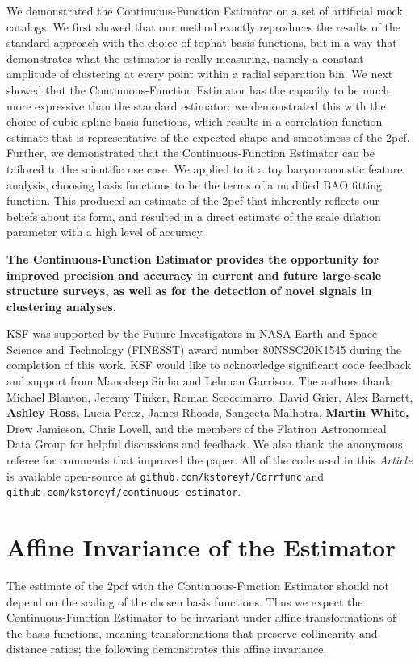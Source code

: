 \documentclass[modern]{aastex62}
\newcommand{\cf}{2pcf\xspace}
\newcommand{\Est}{The Continuous-Function Estimator\xspace}
\newcommand{\est}{the Continuous-Function Estimator\xspace}
\newcommand{\documentname}{\textsl{Article}\xspace}
\newcommand{\new}[1]{\textbf{#1}}
\begin{document}
We demonstrated \est on a set of artificial mock catalogs.
We first showed that our method exactly reproduces the results of the standard approach with the choice of tophat basis functions, but in a way that demonstrates what the estimator is really measuring, namely a constant amplitude of clustering at every point within a radial separation bin.
We next showed that \est has the capacity to be much more expressive than the standard estimator: we demonstrated this with the choice of cubic-spline basis functions, which results in a correlation function estimate that is representative of the expected shape and smoothness of the \cf.
Further, we demonstrated that \est can be tailored to the scientific use case.
We applied to it a toy baryon acoustic feature analysis, choosing basis functions to be the terms of a modified BAO fitting function.
This produced an estimate of the \cf that inherently reflects our beliefs about its form, and resulted in a direct estimate of the scale dilation parameter with a high level of accuracy.

\new{\Est provides the opportunity for improved precision and accuracy in current and future large-scale structure surveys, as well as for the detection of novel signals in clustering analyses.}


\acknowledgements
KSF was supported by the Future Investigators in NASA Earth and Space Science and Technology (FINESST) award number 80NSSC20K1545 during the completion of this work.
KSF would like to acknowledge significant code feedback and support from Manodeep Sinha and Lehman Garrison.
The authors thank Michael Blanton, Jeremy Tinker, Roman Scoccimarro, David Grier, Alex Barnett, \new{Ashley Ross,} Lucia Perez, James Rhoads, Sangeeta Malhotra, \new{Martin White,} Drew Jamieson, Chris Lovell, and the members of the Flatiron Astronomical Data Group for helpful discussions and feedback. 
We also thank the anonymous referee for comments that improved the paper.
All of the code used in this \documentname is available open-source at \texttt{github.com/kstoreyf/Corrfunc} and \texttt{github.com/kstoreyf/continuous-estimator}. 


\appendix

\section{Affine Invariance of the Estimator}\label{sec:affine}

The estimate of the \cf with \est should not depend on the scaling of the chosen basis functions.
Thus we expect \est to be invariant under affine transformations of the basis functions, meaning transformations that preserve collinearity and distance ratios; the following demonstrates this affine invariance.
\end{document}
